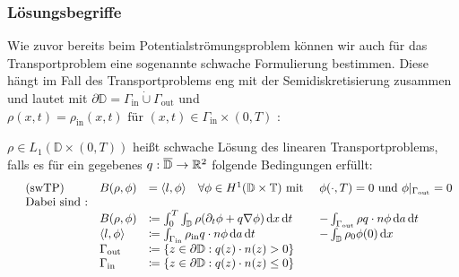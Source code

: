 \subsubsection{Lösungsbegriffe}
	Wie zuvor bereits beim Potentialströmungsproblem können wir auch für das Transportproblem eine sogenannte schwache Formulierung bestimmen. Diese hängt im Fall des Transportproblems eng mit der Semidiskretisierung zusammen und lautet mit $ \partial \mathbb{D} = \Gamma_{\text{in}} \dot{\cup} \Gamma_{\text{out}} $ und 
$\rho(x,t) = \rho_{\text{in}}(x,t) \text{ für } (x,t) \in \Gamma_{\text{in}} \times (0,T)$ :
\begin{Definition} 
	$ \rho \in L_1 (\mathbb{D} \times (0,T)) $ heißt schwache Lösung des linearen Transportproblems, falls es für ein gegebenes $ q : \overline{\mathbb{D}} \to \mathbb{R}^2 $ folgende Bedingungen erfüllt:
	\begin{align*}
	\begin{array}{rllll}
	&\text{(swTP)} \ &B(\rho,\phi) &= \langle l,\phi\rangle \quad \forall \phi \in H^1(\mathbb{D}\times\mathbb{T}) \text{ mit } &\phi(\cdot,T) = 0 \text{ und } \phi|_{\Gamma_{\text{out}}} = 0 \\
	&\text{Dabei sind :} & & &\\
	& &B(\rho,\phi) &\coloneqq  \int_{0}^{T} \int_{\mathbb{D}} \rho (\partial_t \phi + q \nabla \phi ) \, \mathrm{d} x \, \mathrm{d} t &- \int_{\Gamma_{\text{out}}} \rho q \cdot n \phi \, \mathrm{d} a  \, \mathrm{d} t \\
	& &\langle l,\phi \rangle &\coloneqq \int_{\Gamma_{\text{in}}} \rho_{\text{in}} q \cdot n \phi \, \mathrm{d} a  \, \mathrm{d} t &- \int_{\mathbb{D}} \rho_0 \phi(0) \, \mathrm{d} x \\
	& & \Gamma_{\text{out}} &\coloneqq  \{ z \in \partial \mathbb{D}: q(z)\cdot n(z) > 0 \} & \\
	& & \Gamma_{\text{in}} &\coloneqq  \{ z \in \partial \mathbb{D}: q(z)\cdot n(z) \leq 0 \} &
	\end{array}\\
	\end{align*}
\end{Definition}
%	


